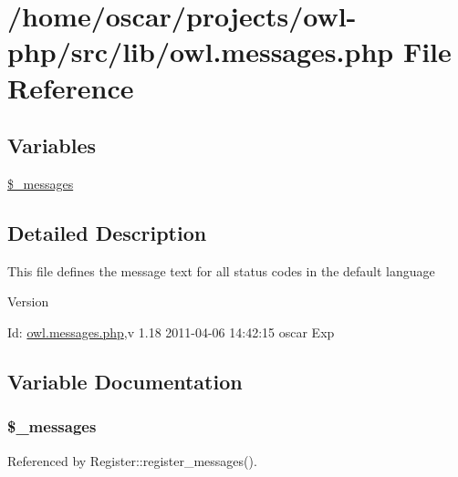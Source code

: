 \section{/home/oscar/projects/owl-\/php/src/lib/owl.messages.php File Reference}
\label{owl_8messages_8php}
\subsection*{Variables}
\begin{DoxyCompactItemize}
\item 
\hyperlink{owl_8messages_8php_a5caca00ffca4d529cdbb748a61f4b015}{\$\_\-messages}
\end{DoxyCompactItemize}


\subsection{Detailed Description}
This file defines the message text for all status codes in the default language \begin{DoxyVersion}{Version}

\end{DoxyVersion}
\begin{DoxyParagraph}{Id:}
\hyperlink{owl_8messages_8php}{owl.messages.php},v 1.18 2011-\/04-\/06 14:42:15 oscar Exp 
\end{DoxyParagraph}


\subsection{Variable Documentation}
\subsubsection[{\$\_\-messages}]{\setlength{\rightskip}{0pt plus 5cm}\$\_\-messages}\label{owl_8messages_8php_a5caca00ffca4d529cdbb748a61f4b015}


Referenced by Register::register\_\-messages().

